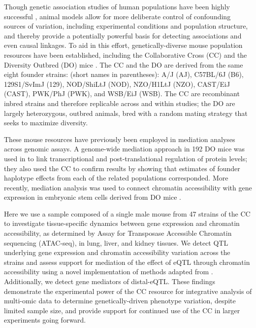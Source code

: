 \documentclass[9pt,twocolumn,twoside]{gsajnl}
\newcommand{\WV}[2]{\textcolor{red}{#1\footnote{\textcolor{red}{WV: #2}}}}
\begin{document}
Though genetic association studies of human populations have been highly successful \citep{Visscher2017}, animal models allow for more deliberate control of confounding sources of variation, including experimental conditions and population structure, and thereby provide a potentially powerful basis for detecting associations and even causal linkages.
To aid in this effort, genetically-diverse mouse population resources have been established, including the Collaborative Cross (CC) \citep{Churchill2004,Hall2012,Srivastava2017} and the Diversity Outbred (DO) mice \citep{Churchill2012}. The CC and the DO are derived from the same eight founder strains: (short names in parentheses): A/J (AJ), C57BL/6J (B6), 129S1/SvImJ (129), NOD/ShiLtJ (NOD), NZO/H1LtJ (NZO), CAST/EiJ (CAST), PWK/PhJ (PWK), and WSB/EiJ (WSB). The CC are recombinant inbred strains and therefore replicable across and within studies; the DO are largely heterozygous, outbred animals, bred with a random mating strategy that seeks to maximize diversity. 

These mouse resources have previously been employed in mediation analyses across genomic assays. A genome-wide mediation approach in 192 DO mice was used in \citet{Chick2016} to link transcriptional and post-translational regulation of protein levels; they also used the CC to confirm results by showing that estimates of founder haplotype effects from each of the related populations corresponded. More recently, mediation analysis was used to connect chromatin accessibility with gene expression in embryonic stem cells derived from DO mice \citep{Skelly2019}.

Here we use a sample composed of a single male mouse from 47 strains of the CC to investigate tissue-specific dynamics between gene expression and  chromatin accessibility, as determined by Assay for Transposase Accessible Chromatin sequencing (ATAC-seq), in lung, liver, and kidney tissues. We detect QTL underlying gene expression and chromatin accessibility variation across the strains and assess support for mediation of the effect of eQTL through chromatin accessibility using a novel implementation of methods adapted from \cite{Chick2016}. Additionally, we detect gene mediators of distal-eQTL. 
These findings demonstrate the experimental power of the CC resource for integrative analysis of multi-omic data to determine genetically-driven phenotype variation, despite limited sample size, and provide support for continued use of the CC in larger experiments going forward.
\end{document}
